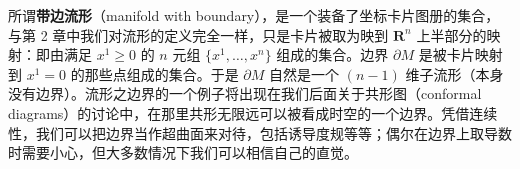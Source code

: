 所谓\textbf{带边流形}（manifold with boundary），是一个装备了坐标卡片图册的集合，与第 2 章中我们对流形的定义完全一样，只是卡片被取为映到 $\mathbf{R}^n$ 上半部分的映射：即由满足 $x^1 \geq 0$ 的 $n$ 元组 $\{x^1, \ldots, x^n\}$ 组成的集合。边界 $\partial M$ 是被卡片映射到 $x^1 = 0$ 的那些点组成的集合。于是 $\partial M$ 自然是一个 $(n-1)$ 维子流形（本身没有边界）。流形之边界的一个例子将出现在我们后面关于共形图（conformal diagrams）的讨论中，在那里共形无限远可以被看成时空的一个边界。凭借连续性，我们可以把边界当作超曲面来对待，包括诱导度规等等；偶尔在边界上取导数时需要小心，但大多数情况下我们可以相信自己的直觉。
